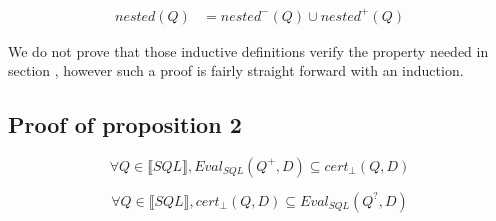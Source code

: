 \begin{mydef}
	
	\begin{align*}
		nested(Q) & = nested^-(Q) \cup nested^+(Q)
	\end{align*}
\end{mydef}

We do not prove that those inductive definitions verify the property needed in section \label{redun}, however such a proof is fairly straight forward with an induction.

\subsection{Proof of proposition 2}
\begin{myprop*}
	$$\forall Q \in \llbracket SQL \rrbracket, Eval_{SQL}(Q^+,D) \subseteq cert_\bot(Q,D)$$
	\end{myprop*}
\begin{myprop*}
	$$\forall Q \in \llbracket SQL \rrbracket, cert_\bot(Q,D) \subseteq Eval_{SQL}(Q^?,D)$$
\end{myprop*}

